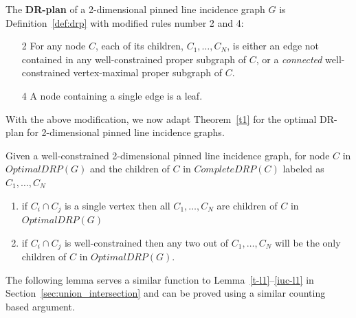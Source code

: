 \begin{definition}

 The \textbf{DR-plan} of  a 2-dimensional pinned line incidence graph $G$ is Definition~\ref{def:drp} with  modified rules number 2 and 4:
    \begin{enumerate}
        \item[2] For any node $C$, each of its children, $C_1,\ldots,C_N$, is either an edge not contained in any well-constrained proper subgraph of $C$, or a {\em connected} well-constrained vertex-maximal proper subgraph of  $C$.
        \item[4] A node containing a single edge is a leaf.
    \end{enumerate}
\end{definition}


With the above modification, 
we now adapt Theorem~\ref{t1} %
for the optimal DR-plan for 2-dimensional pinned line incidence graphs.


\begin{corollary}
Given a well-constrained 2-dimensional pinned line incidence graph, for node $C$ in $OptimalDRP(G)$ and the children of $C$ in $CompleteDRP(C)$ labeled as $C_1,\ldots,C_N$
\begin{enumerate}
    \item if $C_i \cap C_j$ is a single vertex then all $C_1,\ldots,C_N$ are children of $C$ in $OptimalDRP(G)$
    \item if $C_i \cap C_j$ is well-constrained then any two out of $C_1,\ldots,C_N$ will be the only children of $C$ in $OptimalDRP(G)$.
\end{enumerate}
\label{cor:pinned}
\end{corollary}

The following lemma serves a similar function to Lemma~\ref{t-l1}--\ref{iuc-l1} in Section~\ref{sec:union_intersection} 
and can be proved using a similar counting based argument.


